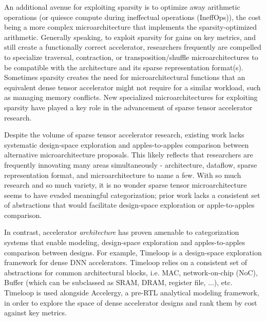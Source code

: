 An additional avenue for exploiting sparsity is to optimize away arithmetic operations \cite{eyerissv2} \cite{sparten}\cite{extensor} \cite{sparch} \cite{szebook} \cite{sparseloop} (or quiesce compute during ineffectual operations (IneffOps)\cite{eyeriss}\cite{sparseloop}\cite{szebook}), the cost being a more complex microarchitecture that implements the sparsity-optimized arithmetic\cite{eyeriss}\cite{eyerissv2}. Generally speaking, to exploit sparsity for gains on key metrics, and still create a functionally correct accelerator, researchers frequently are compelled to specialize traversal\cite{szebook}\cite{extensor}, contraction\cite{gamma}\cite{eyerissv2}\cite{extensor}\cite{sparten}, or transposition/shuffle\cite{gamma} microarchitectures to be compatible with the architecture and its sparse representation format(s). Sometimes sparsity creates the need for microarchitectural functions that an equivalent dense tensor accelerator might not require for a similar workload, such as managing memory conflicts\cite{scnn}\cite{sparten}. New specialized microarchitectures for exploiting sparsity have played a key role in the advancement of sparse tensor accelerator research\cite{gamma}\cite{outerspace}\cite{extensor}\cite{sparch}\cite{outerspace}\cite{ampere}.

Despite the volume of sparse tensor accelerator research, existing work lacks systematic design-space exploration and apples-to-apples comparison between alternative microarchitecture proposals. This likely reflects that researchers are frequently innovating many areas simultaneously - architecture, dataflow, sparse representation format, and microarchitecture to name a few\cite{gamma}\cite{matraptor}\cite{eyeriss}\cite{candles}. With so much research and so much variety, it is no wonder sparse tensor microarchitecture seems to have evaded meaningful categorization; prior work lacks a consistent set of abstractions that would facilitate design-space exploration or apple-to-apples comparison.

In contrast, accelerator \textit{architecture} has proven amenable to categorization systems that enable modeling, design-space exploration and apples-to-apples comparison between designs\cite{timeloop}\cite{sparseloop}\cite{accelergy}\cite{buffet}. For example, Timeloop\cite{timeloop} is a design-space exploration framework for dense DNN accelerators. Timeloop relies on a consistent set of abstractions for common architectural blocks, i.e. MAC, network-on-chip (NoC), Buffer (which can be subclassed as SRAM, DRAM, register file, ...), etc. Timeloop is used alongside Accelergy\cite{accelergy}, a pre-RTL analytical modeling framework, in order to explore the space of dense accelerator designs and rank them by cost against key metrics.

